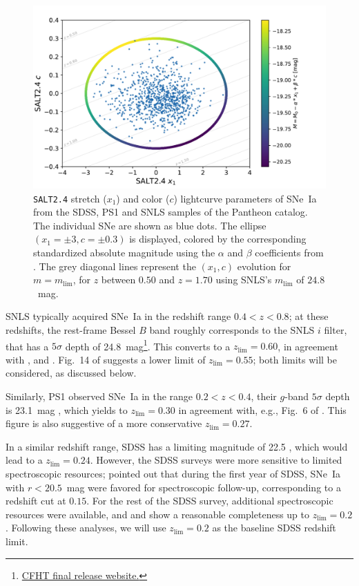 \documentclass[]{aa}
\begin{document}
\begin{figure}
    \centering
    \includegraphics[width=0.95\linewidth]{Article_figures/zmax_maglim_snls.pdf}
    \caption{\textsc{\texttt{SALT2.4}} stretch ($x_1$) and color ($c$)
        lightcurve parameters of SNe~Ia from the SDSS, PS1 and SNLS samples of
        the Pantheon catalog. The individual SNe are shown as blue dots. The
        ellipse $(x_1=\pm3, c=\pm0.3)$ is displayed, colored by the
        corresponding standardized absolute magnitude using the $\alpha$ and
        $\beta$ coefficients from \cite{scolnic2018a}. The grey diagonal lines
        represent the $(x_1, c)$ evolution for $m = m_{\lim}$, for $z$ between
        $0.50$ and $z=1.70$ using SNLS's $m_{\lim}$ of $24.8$~mag.}
    \label{fig:maglim}
\end{figure}

SNLS typically acquired SNe~Ia in the redshift range $0.4<z<0.8$; at these
redshifts, the rest-frame Bessel $B$ band roughly corresponds to the SNLS $i$
filter, that has a $5\sigma$ depth of
24.8~mag\footnote{\href{https://www.cfht.hawaii.edu/Science/CFHTLS/cfhtlsfinalreleaseexecsummary.html}{CFHT
final release website.}}. This converts to a $z_{\lim}=0.60$, in agreement with
\cite{neill2006}, \cite{perrett2010} and \cite{bazin2011}. Fig.~14 of
\cite[][see their Section~5]{perrett2010} suggests a lower limit of
$z_{\lim}=0.55$; both limits will be considered, as discussed below.

Similarly, PS1 observed SNe~Ia in the range $0.2<z<0.4$, their $g$-band
$5\sigma$ depth is 23.1~mag \citep{rest2014}, which yields to $z_{\lim}=0.30$ in
agreement with, e.g., Fig.~6 of \cite{scolnic2018a}. This figure is also
suggestive of a more conservative $z_{\lim}=0.27$.

In a similar redshift range, SDSS has a limiting magnitude of 22.5
\citep{dilday2008, sako2008}, which would lead to a $z_{\lim}=0.24$. However, the
SDSS surveys were more sensitive to limited spectroscopic resources; \cite[][see
their Section~2]{kessler2009} pointed out that during the first year of SDSS,
SNe~Ia with $r<20.5$~mag were favored for spectroscopic follow-up, corresponding
to a redshift cut at $0.15$. For the rest of the SDSS survey, additional
spectroscopic resources were available, and \cite{kessler2009} and
\cite{dilday2008} show a reasonable completeness up to $z_{\lim}=0.2$. Following
these analyses, we will use $z_{\lim}=0.2$ as the baseline SDSS redshift limit.
\end{document}
